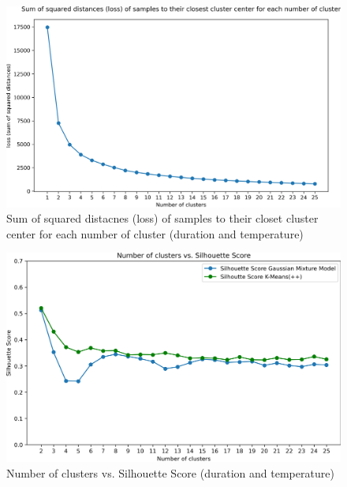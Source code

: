 \begin{figure}[H]
   \centering
    \includegraphics[width=1\linewidth]{./Figures/Loss_Duration_Temp.png}
    \caption{Sum of squared distacnes (loss) of samples to their closet cluster center for each number of cluster (duration and temperature)}
    \label{Loss_Duration_Temp}
\end{figure}

\begin{figure}[H]
   \centering
    \includegraphics[width=1\linewidth]{./Figures/Silhouette_Gaussian_Duration_Temp.png}
    \caption{Number of clusters vs. Silhouette Score (duration and temperature)}
    \label{Silhouette_Gaussian_Duration_Temp}
\end{figure}

